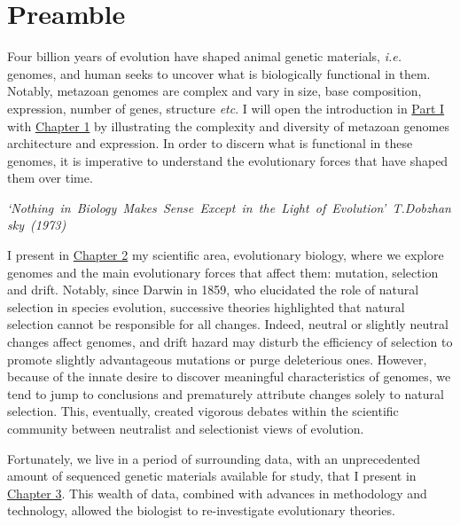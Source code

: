 
\chapter*{Preamble}

\vspace{-5pt}

Four billion years of evolution have shaped animal genetic materials, \textit{i.e.} genomes, and human seeks to uncover what is biologically functional in them. Notably, metazoan genomes are complex and vary in size, base composition, expression, number of genes, structure \textit{etc}. I will open the introduction in \hyperref[part:intro]{Part I} with \hyperref[chap:intro-metazoan_genome]{Chapter 1} by illustrating the complexity and diversity of metazoan genomes architecture and expression. In order to discern what is functional in these genomes, it is imperative to understand the evolutionary forces that have shaped them over time.
\vspace{-19pt}
\begin{center}
\mbox{\textit{`Nothing in Biology Makes Sense Except in the Light of Evolution' T.Dobzhansky (\textcolor{BLUEROYAL}{1973})}}
\end{center}

I present in \hyperref[chap:intro-evol_forces]{Chapter 2} my scientific area, evolutionary biology, where we explore genomes and the main evolutionary forces that affect them: mutation, selection and drift. Notably, since Darwin in 1859, who elucidated the role of natural selection in species evolution, successive theories highlighted that natural selection cannot be responsible for all changes. Indeed, neutral or slightly neutral changes affect genomes, and drift hazard may disturb the efficiency of selection to promote slightly advantageous mutations or purge deleterious ones. However, because of the innate desire to discover meaningful characteristics of genomes, we tend to jump to conclusions and prematurely attribute changes solely to natural selection. This, eventually, created vigorous debates within the scientific community between neutralist and selectionist views of evolution. 

Fortunately, we live in a period of surrounding data, with an unprecedented amount of sequenced genetic materials available for study, that I present in \hyperref[chap:intro-biol_evol]{Chapter 3}. This wealth of data, combined with advances in methodology and technology, allowed the biologist to re-investigate evolutionary theories.

